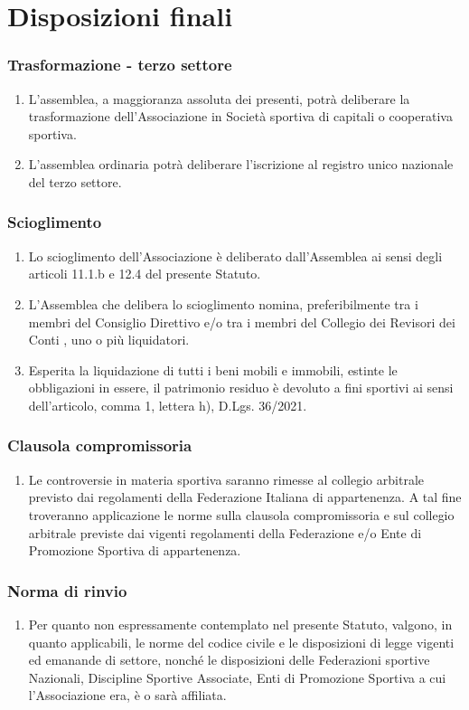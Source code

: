 \documentclass{djtsasddoc}
\begin{document}
	\part{Disposizioni finali}
	\section{Trasformazione - terzo settore}
	\begin{enumerate}
		\item L'assemblea, a maggioranza assoluta dei presenti, potrà deliberare la trasformazione dell'Associazione in Società sportiva di capitali o cooperativa sportiva.
		\item L'assemblea ordinaria potrà deliberare l'iscrizione al registro unico nazionale del terzo settore.
	\end{enumerate}
	
	\section{Scioglimento}
	\begin{enumerate}
		\item Lo scioglimento dell'Associazione è deliberato dall'Assemblea ai sensi degli articoli 11.1.b e 12.4 del presente Statuto.
		\item L'Assemblea che delibera lo scioglimento nomina, preferibilmente tra i membri del  Consiglio Direttivo e/o  tra i membri del Collegio dei Revisori dei Conti , uno o più liquidatori.
		\item Esperita la liquidazione di tutti i beni mobili e immobili, estinte le obbligazioni in essere, il patrimonio residuo è devoluto a fini sportivi ai sensi dell'articolo, comma 1, lettera h), D.Lgs. 36/2021.
	\end{enumerate}
	
	\section{Clausola compromissoria}
	\begin{enumerate}
		\item Le controversie in materia sportiva saranno rimesse al collegio arbitrale previsto dai regolamenti della Federazione Italiana di appartenenza. A tal fine troveranno applicazione le norme sulla clausola compromissoria e sul collegio arbitrale previste dai vigenti regolamenti della Federazione e/o Ente di Promozione Sportiva di appartenenza.
	\end{enumerate}
	
	\section{Norma di rinvio}
	\begin{enumerate}
		\item Per quanto non espressamente contemplato nel presente Statuto, valgono, in quanto applicabili, le norme del codice civile e le disposizioni di legge vigenti ed emanande di settore, nonché le disposizioni delle Federazioni sportive Nazionali, Discipline Sportive Associate, Enti di Promozione Sportiva a cui l'Associazione era, è o sarà affiliata.
	\end{enumerate}
	
\end{document}
